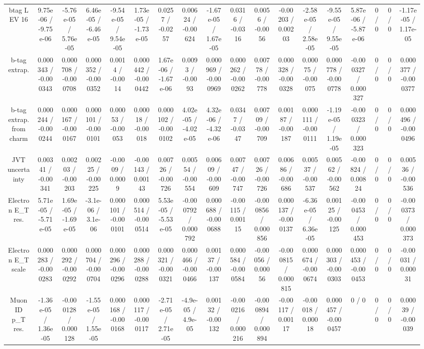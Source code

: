 \documentclass[10pt]{article}
\begin{document}
\begin{table}[htbp]
\begin{center}
\begin{tabular}{|c|c|c|c|c|c|c|c|c|c|c|c|c|c|c|c|c|c|}
  btag L EV 16 & 9.75e-06 / -9.75e-06 & -5.76e-05 / 5.76e-05 & 6.46e-05 / -6.46e-05 & -9.54e-05 / 9.54e-05 & 1.73e-05 / -1.73e-05 & 0.0257 / -0.0257 & 0.00624 / -0.00624 & -1.67e-05 / 1.67e-05 & 0.0316 / -0.0316 & 0.0056 / -0.0056 & -0.00203 / 0.00203 & -2.58e-05 / 2.58e-05 & -9.55e-05 / 9.55e-05 & 5.87e-06 / -5.87e-06 & 0 / 0 & 0 / 0 & -1.17e-05 / 1.17e-05 \\ 
  b-tag extrap. & 0.000343 / -0.000343 & 0.000708 / -0.000708 & 0.000352 / -0.000352 & 0.0014 / -0.0014 & 0.000442 / -0.000442 & 1.67e-06 / -1.67e-06 & 0.0093 / -0.0093 & 0.000969 / -0.000969 & 0.000262 / -0.000262 & 0.00778 / -0.00778 & 0.000328 / -0.000328 & 0.00075 / -0.00075 & 0.000778 / -0.000778 & -0.000327 / 0.000327 & 0 / 0 & 0 / 0 & 0.000377 / -0.000377 \\ 
  b-tag extrap. from charm & 0.000244 / -0.000244 & 0.000167 / -0.000167 & 0.000101 / -0.000101 & 0.00053 / -0.00053 & 0.00018 / -0.00018 & 0.000102 / -0.000102 & 4.02e-05 / -4.02e-05 & 4.32e-06 / -4.32e-06 & 0.0347 / -0.0347 & 0.00709 / -0.00709 & 0.00187 / -0.00187 & 0.000111 / -0.000111 & -1.19e-05 / 1.19e-05 & -0.000323 / 0.000323 & 0 / 0 & 0 / 0 & 0.000496 / -0.000496 \\ 
  JVT uncertainty & 0.00341 / -0.00341 & 0.00203 / -0.00203 & 0.00225 / -0.00225 & -0.0009 / 0.0009 & -0.00143 / 0.00143 & 0.00726 / -0.00726 & 0.00554 / -0.00554 & 0.00609 / -0.00609 & 0.00747 / -0.00747 & 0.00726 / -0.00726 & 0.00686 / -0.00686 & 0.00537 / -0.00537 & 0.00562 / -0.00562 & -0.00824 / 0.00824 & 0 / 0 & 0 / 0 & 0.00536 / -0.00536 \\ 
  Electron E_{T} res. & 5.71e-05 / -5.71e-05 & 1.69e-05 / -1.69e-05 & -3.1e-06 / 3.1e-06 & 0.000101 / -0.000101 & 0.000514 / -0.000514 & 5.53e-05 / -5.53e-05 & -0.000792 / 0.000792 & 0.000688 / -0.000688 & -0.00115 / 0.00115 & -0.000856 / 0.000856 & 0.000137 / -0.000137 & -6.36e-05 / 6.36e-05 & 0.00125 / -0.00125 & -0.000453 / 0.000453 & 0 / 0 & 0 / 0 & -0.000373 / 0.000373 \\ 
  Electron E_{T} scale & 0.000283 / -0.000283 & 0.000292 / -0.000292 & 0.000704 / -0.000704 & 0.000296 / -0.000296 & 0.000288 / -0.000288 & 0.000321 / -0.000321 & 0.000466 / -0.000466 & 0.00137 / -0.00137 & 0.000584 / -0.000584 & -0.00056 / 0.00056 & -0.000815 / 0.000815 & 0.000674 / -0.000674 & 0.000303 / -0.000303 & 0.000453 / -0.000453 & 0 / 0 & 0 / 0 & -0.00031 / 0.00031 \\ 
  Muon ID p_{T} res. & -1.36e-05 / 1.36e-05 & -0.000128 / 0.000128 & -1.55e-05 / 1.55e-05 & 0.000168 / -0.000168 & 0.000117 / -0.000117 & -2.71e-05 / 2.71e-05 & -4.9e-05 / 4.9e-05 & 0.00132 / -0.00132 & -0.000216 / 0.000216 & -0.000894 / 0.000894 & -0.00117 / 0.00117 & -0.00018 / 0.00018 & 0.000457 / -0.000457 & 0 / 0 & 0 / 0 & 0 / 0 & 0.00039 / -0.00039 \\ 

\end{tabular}
\end{center}
\end{table}
\end{document}

